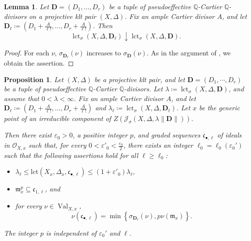 \documentclass[a4paper,12pt]{amsart}
\newtheorem{lemma}[theorem]{Lemma}
\newtheorem{proposition}[theorem]{Proposition}
\theoremstyle{plain}
\theoremstyle{definition}
\numberwithin{equation}{section}
\newcommand{\Q}{\mathbb{Q}}
\DeclareMathOperator{\Val}{Val}
\def\lct{\operatorname{lct}}
\begin{document}
\begin{lemma}\label{lem:decreasing}
    Let $\mathbf{D}=(D_1,\dots,D_r)$ be a tuple of pseudoeffective $\Q$-Cartier $\Q$-divisors on a projective klt pair $(X,\Delta)$. Fix an ample Cartier divisor $A$, and let $\mathbf{D}_{\ell}\coloneqq (D_1+\frac{A}{\ell!},\dots,D_r+\frac{A}{\ell!})$. Then
    \[
    \lct_{\sigma}(X,\Delta,\mathbf{D}_{\ell})\downarrow\lct_{\sigma}(X,\Delta,\mathbf{D}).
    \]
\end{lemma}
\begin{proof}
    For each $\nu$, $\sigma_{\mathbf{D}_{\ell}}(\nu)$ increases to $\sigma_{\mathbf{D}}(\nu)$. As in the argument of \cite[Lemma 2.11]{CJKL}, we obtain the assertion.
\end{proof}

\begin{proposition} \label{thickening}
Let $(X,\Delta)$ be a projective klt pair, and let $\mathbf{D}=(D_1,\cdots,D_r)$ be a tuple of pseudoeffective \(\Q\)-Cartier $\Q$-divisors. Let \(\lambda\coloneqq \lct_{\sigma}(X,\Delta,\mathbf D)\), and assume that $0<\lambda<\infty$. Fix an ample Cartier divisor $A$, and let $\mathbf{D}_{\ell}\coloneqq (D_1+\frac{A}{\ell!},\dots,D_r+\frac{A}{\ell!})$ and $\lambda_{\ell}\coloneqq \lct_{\sigma}(X,\Delta,\mathbf{D}_{\ell})$. Let $x$ be the generic point of an irreducible component of $Z\left(\mathcal{J}_{\sigma}\left(X,\Delta,\lambda\|\mathbf{D}\|\right)\right)$.

Then there exist $\varepsilon_0>0$, a positive integer $p$, and graded sequences $\mathfrak{c}_{\bullet,\ell}$ of ideals in $\mathcal{O}_{X,x}$ such that, for every $0<\varepsilon'_0<\frac{\varepsilon_0}{2}$, there exists an integer $\ell_0=\ell_0(\varepsilon_0')$ such that the following assertions hold for all $\ell\ge \ell_0$:
\begin{itemize}
    \item[(1)] $\lambda_{\ell}\leq \mathrm{lct}(X_x,\Delta_x,\mathfrak{c}_{\bullet,\ell})\le (1+\varepsilon'_0)\lambda_{\ell}$,
    \item[(2)] $\mathfrak{m}^p_x\subseteq \mathfrak{c}_{1,\ell}$, and
    \item[(3)] for every \(\nu\in \Val_{X,x}\), 
    $$\nu(\mathfrak{c}_{\bullet,\ell})=\min\left\{\sigma_{\mathbf{D}_{\ell}}(\nu),p\nu(\mathfrak{m}_x)\right\}.$$
\end{itemize}
The integer $p$ is independent of $\varepsilon_0'$ and $\ell$.
\end{proposition}
\end{document}
